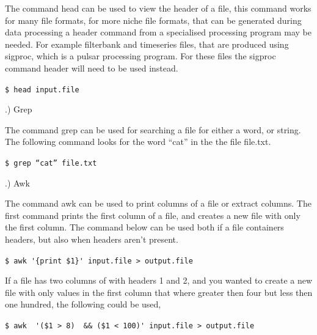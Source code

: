 \documentclass[11pt,fleqn]{book} %
\begin{document}
\noindent The command head can be used to view the header of a file, this command works for many file formats, for more niche file formats, that can be generated during data processing a header command from a specialised processing program may be needed. For example filterbank and timeseries files, that are produced using sigproc, which is a pulsar processing program. For these files the sigproc command header will need to be used instead.
\vspace{3mm}

\verb|$ head input.file|

\vspace{3mm}


.) Grep
\vspace{3mm}

\noindent The command grep can be used for searching a file for either a word, or string. The following command looks for the word “cat” in the the file file.txt.

\vspace{3mm}

\verb|$ grep “cat” file.txt|

\vspace{3mm}
.) Awk
\vspace{3mm}

\vspace{3mm}

\noindent The command awk can be used to print columns of a file or extract columns. The first command prints the first column of a file, and creates a new file with only the first column. The command below can be used both if a file containers headers, but also when headers aren't present.

\vspace{3mm}\vspace{3mm}

\verb|$ awk '{print $1}' input.file > output.file|

\vspace{3mm}

\noindent If a file has two columns of with headers 1 and 2, and you wanted to create a new file with only values in the first column that where greater then four but less then one hundred, the following could be used,
 
\vspace{3mm}

\verb|$ awk  '($1 > 8)  && ($1 < 100)' input.file > output.file|

\vspace{3mm}
\end{document}
